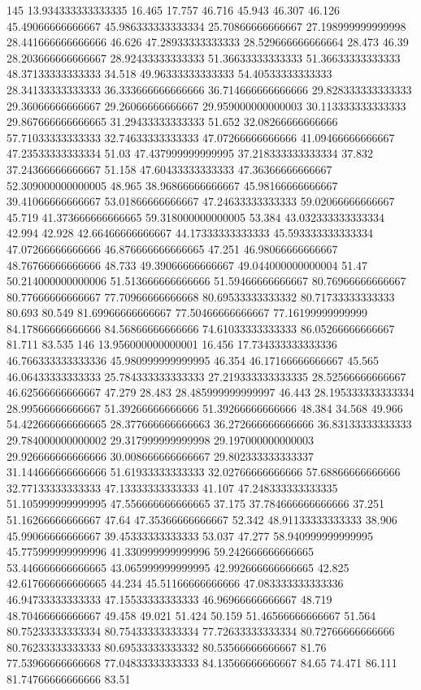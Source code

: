 145 13.934333333333335 16.465 17.757 46.716 45.943 46.307 46.126 45.49066666666667 45.986333333333334 25.70866666666667 27.198999999999998 28.441666666666666 46.626 47.28933333333333 28.529666666666664 28.473 46.39 28.203666666666667 28.92433333333333 51.36633333333333 51.36633333333333 48.37133333333333 34.518 49.96333333333333 54.40533333333333 28.34133333333333 36.333666666666666 36.714666666666666 29.828333333333333 29.36066666666667 29.26066666666667 29.959000000000003 30.113333333333333 29.867666666666665 31.29433333333333 51.652 32.08266666666666 57.71033333333333 32.74633333333333 47.07266666666666 41.09466666666667 47.23533333333334 51.03 47.437999999999995 37.218333333333334 37.832 37.24366666666667 51.158 47.60433333333333 47.36366666666667 52.309000000000005 48.965 38.96866666666667 45.98166666666667 39.41066666666667 53.01866666666667 47.24633333333333 59.02066666666667 45.719 41.373666666666665 59.318000000000005 53.384 43.032333333333334 42.994 42.928 42.66466666666667 44.17333333333333 45.593333333333334 47.07266666666666 46.876666666666665 47.251 46.98066666666667 48.76766666666666 48.733 49.39066666666667 49.044000000000004 51.47 50.214000000000006 51.513666666666666 51.59466666666667 80.76966666666667 80.77666666666667 77.70966666666668 80.69533333333332 80.71733333333333 80.693 80.549 81.69966666666667 77.50466666666667 77.16199999999999 84.17866666666666 84.56866666666666 74.61033333333333 86.05266666666667 81.711 83.535
146 13.956000000000001 16.456 17.734333333333336 46.766333333333336 45.980999999999995 46.354 46.17166666666667 45.565 46.06433333333333 25.784333333333333 27.219333333333335 28.52566666666667 46.62566666666667 47.279 28.483 28.485999999999997 46.443 28.195333333333334 28.99566666666667 51.39266666666666 51.39266666666666 48.384 34.568 49.966 54.422666666666665 28.377666666666663 36.272666666666666 36.83133333333333 29.784000000000002 29.317999999999998 29.197000000000003 29.926666666666666 30.008666666666667 29.802333333333337 31.144666666666666 51.61933333333333 32.02766666666666 57.68866666666666 32.77133333333333 47.13333333333333 41.107 47.248333333333335 51.105999999999995 47.556666666666665 37.175 37.784666666666666 37.251 51.16266666666667 47.64 47.35366666666667 52.342 48.91133333333333 38.906 45.99066666666667 39.45333333333333 53.037 47.277 58.940999999999995 45.775999999999996 41.330999999999996 59.242666666666665 53.446666666666665 43.065999999999995 42.992666666666665 42.825 42.617666666666665 44.234 45.51166666666666 47.083333333333336 46.94733333333333 47.15533333333333 46.96966666666667 48.719 48.70466666666667 49.458 49.021 51.424 50.159 51.46566666666667 51.564 80.75233333333334 80.75433333333334 77.72633333333334 80.72766666666666 80.76233333333333 80.69533333333332 80.53566666666667 81.76 77.53966666666668 77.04833333333333 84.13566666666667 84.65 74.471 86.111 81.74766666666666 83.51
